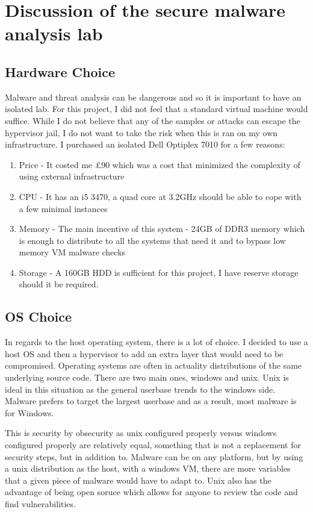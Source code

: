 
\chapter{Discussion of the secure malware analysis lab}
\section{Hardware Choice}
Malware and threat analysis can be dangerous and so it is important to have an isolated lab. For this project, I did not feel that a standard virtual machine would suffice. While I do not believe that any of the samples or attacks can escape the hypervisor jail, I do not want to take the risk when this is ran on my own infrastructure. 
I purchased an isolated Dell Optiplex 7010 for a few reasons: 
\begin{enumerate}
    \item Price - It costed me £90 which was a cost that minimized the complexity of using external infrastructure
    \item CPU - It has an i5 3470, a quad core at 3.2GHz should be able to cope with a few minimal instances
    \item Memory - The main incentive of this system - 24GB of DDR3 memory which is enough to distribute to all the systems that need it and to bypass low memory VM malware checks
    \item Storage - A 160GB HDD is sufficient for this project, I have reserve storage should it be required.
\end{enumerate}

\section{OS Choice}
In regards to the host operating system, there is a lot of choice. I decided to use a host OS and then a hypervisor to add an extra layer that would need to be compromised. Operating systems are often in actuality distributions of the same underlying source code. There are two main ones, windows and unix. Unix is ideal in this situation as the general userbase trends to the windows side. Malware prefers to target the largest userbase and as a result, most malware is for Windows.

This is security by obsecurity as unix configured properly versus windows configured properly are relatively equal, something that is not a replacement for security steps, but in addition to. Malware can be on any platform, but by using a unix distribution as the host, with a windows VM, there are more variables that a given piece of malware would have to adapt to. Unix also has the advantage of being open soruce which allows for anyone to review the code and find vulnerabilities.

